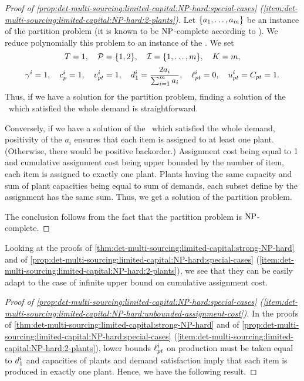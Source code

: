 \begin{proof}[Proof of \cref{prop:det-multi-sourcing:limited-capital:NP-hard:special-cases} (\cref{item:det-multi-sourcing:limited-capital:NP-hard:2-plants})]
Let $\crbracket{a_1,\ldots,a_m}$ be an instance of the partition problem (it is known to be $\operatorname{NP}$-complete according to \cite{Garey1979}).
We reduce polynomially this problem to an instance of the \tbc.
We set
$$
  \horizon=1
  ,\quad
  \plants=\crbracket{1,2}
  ,\quad
  \REF=\range[1]{m}
  ,\quad
  \capital = m,
$$
$$
  \gamma^i=1
  ,\quad
  c_p^i=1
  ,\quad
  v_{pt}^i=1
  ,\quad
  d_1^i=\frac{2a_i}{\sum_{i=1}^{m}a_i}
  ,\quad
  \ell_{pt}^i=0
  ,\quad
  u_{pt}^i=C_{pt}=1.
$$
Thus, if we have a solution for the partition problem, finding a solution of the \tbc\ which satisfied the whole demand is straightforward.

Conversely, if we have a solution of the \tbc\ which satisfied the whole demand, positivity of the $a_i$ ensures that each item is assigned to at least one plant.
(Otherwise, there would be positive backorder.)
Assignment cost being equal to 1 and cumulative assignment cost being upper bounded by the number of item, each item is assigned to exactly one plant.
Plants having the same capacity and sum of plant capacities being equal to sum of demands, each subset define by the assignment has the same sum.
Thus, we get a solution of the partition problem.

The conclusion follows from the fact that the partition problem is $\operatorname{NP}$-complete.
\end{proof}



Looking at the proofs of \cref{thm:det-multi-sourcing:limited-capital:strong-NP-hard} and of \cref{prop:det-multi-sourcing:limited-capital:NP-hard:special-cases} (\cref{item:det-multi-sourcing:limited-capital:NP-hard:2-plants}), we see that they can be easily adapt to the case of infinite upper bound on cumulative assignment cost.



\begin{proof}[Proof of \cref{prop:det-multi-sourcing:limited-capital:NP-hard:special-cases} (\cref{item:det-multi-sourcing:limited-capital:NP-hard:unbounded-assignment-cost})]
In the proofs of \cref{thm:det-multi-sourcing:limited-capital:strong-NP-hard} and of \cref{prop:det-multi-sourcing:limited-capital:NP-hard:special-cases} (\cref{item:det-multi-sourcing:limited-capital:NP-hard:2-plants}), lower bounds $\ell_{pt}^i$ on production must be taken equal to $d_1^i$ and capacities of plants and demand satisfaction imply that each item is produced in exactly one plant.
Hence, we have the following result.
\end{proof}



